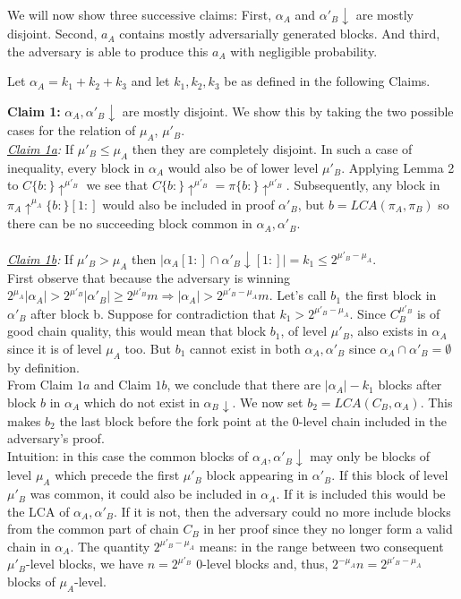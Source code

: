 \documentclass[11pt,a4paper]{article}
\begin{document}
We will now show three successive claims: First, $\alpha_A$ and $\alpha'_B \downarrow$ are mostly disjoint. Second, $a_A$ contains mostly adversarially generated blocks. And third, the adversary is able to produce this $a_A$ with negligible probability.

Let $\alpha_A = k_1 + k_2 + k_3$ and let $k_1, k_2, k_3$ be as defined in the following Claims.

\textbf{Claim 1:} $\alpha_A, \alpha'_B\downarrow$ are mostly disjoint. We show this by taking the two possible cases for the relation of $\mu_A$, $\mu'_B$.\\
\textit{\underline{Claim 1a}:} If $\mu'_B \leq \mu_A$ then they are completely disjoint. In such a case of inequality, every block in $\alpha_A$ would also be of lower level $\mu'_B$. Applying Lemma 2 to $C\{b:\}\uparrow^{\mu'_B}$  we see that $C\{b:\}\uparrow^{\mu'_B} = \pi\{b:\}\uparrow^{\mu'_B}$. Subsequently, any block in $\pi_A\uparrow^{\mu_A}\{b:\}[1:]$ would also be included in proof $\alpha'_B$, but $b=LCA(\pi_A, \pi_B)$ so there can be no succeeding block common in $\alpha_A, \alpha'_B$. \\
\\
\textit{\underline{Claim 1b}:} If  $\mu'_B > \mu_A$ then $\vert \alpha_A[1:] \cap \alpha'_B\downarrow[1:] \vert = k_1 \leq 2^{\mu'_B - \mu_A}$.\\
First observe that because the adversary is winning $2^{\mu_A} \vert \alpha_A \vert > 2^{\mu'_B} \vert \alpha'_B \vert \geq 2^{\mu'_B} m \Rightarrow \vert \alpha_A \vert > 2^{\mu'_B - \mu_A}m$.
Let's call $b_1$ the first block in $\alpha'_B$ after block b.
Suppose for contradiction that $k_1 > 2^{\mu'_B - \mu_A}$.  Since $C_B^{\mu'_B}$ is of good chain quality, this would mean that block $b_1$, of level $\mu'_B$, also exists in $\alpha_A$ since it is of level $\mu_A$ too. But $b_1$ cannot exist in both $\alpha_A, \alpha'_B$ since $\alpha_A \cap \alpha'_B = \emptyset$ by definition.  \\


From Claim $1a$ and Claim $1b$, we conclude that there are $\vert \alpha_A \vert - k_1$ blocks after block $b$ in $\alpha_A$ which do not exist in $\alpha_B\downarrow$. We now set $b_2 = LCA(C_B, \alpha_A)$. This makes $b_2$ the last block before the fork point at the 0-level chain included in the adversary's proof.\\

Intuition: in this case the common blocks of $\alpha_A, \alpha'_B\downarrow$ may only be blocks of level $\mu_A$ which precede the first $\mu'_B$ block appearing in $\alpha'_B$. If this block of level $\mu'_B$ was common, it could also be included in $\alpha_A$. If it is included this would be the LCA of $\alpha_A, \alpha'_B$. If it is not, then the adversary could no more include blocks from the common part of chain $C_B$ in her proof since they no longer form a valid chain in $\alpha_A$. The quantity $2^{\mu'_B - \mu_A}$ means: in the range between two consequent $\mu'_B$-level blocks, we have $n = 2^{\mu'_B}$ 0-level blocks and, thus, $2^{-\mu_A}n = 2^{\mu'_B - \mu_A}$ blocks of $\mu_A$-level. \\
\end{document}

